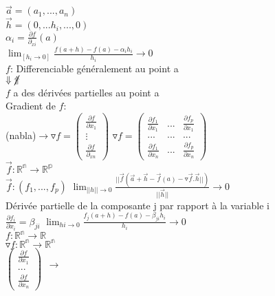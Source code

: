 \documentclass{article}
\begin{document}
    $\vec{a}=(a_1,...,a_n)$\\
    $\vec{h}=(0,...h_i,...,0)$\\
    $\alpha_i =\frac{\partial f}{\partial_{xi}}(a)$\\
    $\lim_[h_i\to 0]\frac{f(a+h)-f(a)-\alpha_i h_i}{h_i}\to 0$\\
    $f$: Differenciable généralement au point a\\
    $\Downarrow \cancel{\Uparrow}$\\
    $f$ a des dérivées partielles au point a\\
    Gradient de $f$:\\
    (nabla)$\to\triangledown f =
    \begin{pmatrix}
        \frac{\partial f}{\partial x_1}\\
        \vdots\\
        \frac{\partial f}{\partial_{xn}}
    \end{pmatrix}$
    $\triangledown f=
    \begin{pmatrix}
        \frac{\partial f_1}{\partial x_1} &...& \frac{\partial f_p}{\partial x_1}\\
        ...&...&...\\
        \frac{\partial f_1}{\partial x_n} &...& \frac{\partial f_p}{\partial x_n}
    \end{pmatrix}$\\
    $\vec{f}: \mathbb{R^n}\to \mathbb{R^p}$\\
    $\vec{f}:(f_1,...,f_p)$
    $\lim_{||h||\to 0}\frac{||\vec{f}(\vec{a}+\vec{h}-\vec{f}(a)-\triangledown\vec{f}.\vec{h}||)}{||\vec{h}||}\to 0$\\
    Dérivée partielle de la composante j par rapport à la variable i\\
    $\frac{\partial f_i}{\partial x_i} = \beta_{ji}$
    $\lim_{hi\to 0}\frac{f_j(a+h)-f(a)-\beta_{ji}h_i}{h_i}\to 0$\\
    $f:\mathbb{R^n}\to \mathbb{R}$\\
    $\triangledown f: \mathbb{R^n}\to \mathbb{R^n}$\\
    $\begin{pmatrix}
        \frac{\partial f}{\partial x_1}\\
        ...\\
        \frac{\partial f}{\partial x_n}
    \end{pmatrix}$
    $\begin{matrix}
        \to\\
        \\
    \end{matrix}$
\end{document}
